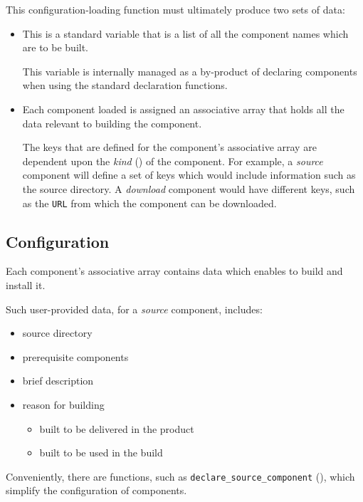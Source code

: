 This configuration-loading function must ultimately produce two sets
of data:

\begin{itemize}
\item \lmsbwcomponents

  This is a standard \gnumake variable that is a list of all the
  component names which are to be built.

  This variable is internally managed as a by-product of declaring
  components when using the standard declaration functions.

\item {}

  Each component loaded is assigned an associative array that holds
  all the data relevant to building the component.

  The keys that are defined for the component's associative array are
  dependent upon the \emph{kind} () of the
  component.  For example, a \emph{source} component will define a set
  of keys which would include information such as the source
  directory.  A \emph{download} component would have different keys,
  such as the \texttt{URL} from which the component can be downloaded.
\end{itemize}


\subsection{ Configuration}

Each component's associative array contains data which enables \lmsbw
to build and install it.

Such user-provided data, for a \emph{source} component, includes:

\begin{itemize}
\item source directory
\item prerequisite components
\item brief description
\item reason for building
  \begin{itemize}
  \item built to be delivered in the product
  \item built to be used in the build
  \end{itemize}
\end{itemize}

Conveniently, there are \lmsbw functions, such as
\texttt{declare\_source\_component}
(), which simplify the
configuration of components.
